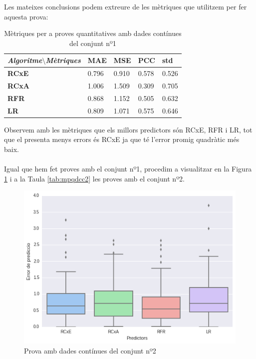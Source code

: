 \documentclass[12pt,a4paper,catalan]{article}
\begin{document}
Les mateixes conclusions podem extreure de les mètriques que utilitzem per fer aquesta prova:

\begin{table}[h]
\centering
\begin{tabular}{lllll}
\hline
\textit{\textbf{Algoritme$\setminus$Mètriques}} & \textbf{MAE} & \textbf{MSE} & \textbf{PCC} & \textbf{std} \\ \hline
\textbf{RCxE}          & 0.796          & 0.910          & 0.578          & 0.526          \\
\textbf{RCxA}          & 1.006          & 1.509          & 0.309          & 0.705          \\
\textbf{RFR}           & 0.868          & 1.152          & 0.505          & 0.632          \\
\textbf{LR}            & 0.809          & 1.071          & 0.575          & 0.646          \\ \hline
\end{tabular}
\caption{Mètriques per a proves quantitatives amb dades contínues del conjunt nº1}
\label{tab:mpqdctp}
\end{table}

Observem amb les mètriques que els millors predictors són RCxE, RFR i LR, tot que el presenta menys errors és RCxE ja que té l'error promig quadràtic més baix.
\\
\\
Igual que hem fet proves amb el conjunt nº1, procedim a visualitzar en la Figura \ref{fig:pdctps} i a la Taula \ref{tab:mpqdcc2} les proves amb el conjunt nº2.

\begin{figure}[h]
\centering
\includegraphics[width=.7\linewidth]{img/boxplot_primersegon_tercer.png}
\caption{Prova amb dades contínues del conjunt nº2}
\label{fig:pdctps}
\end{figure}
\end{document}
